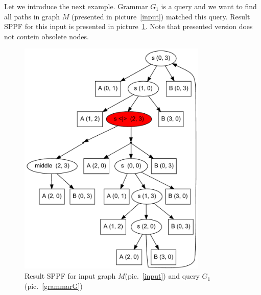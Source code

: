 \documentclass{sig-alternate} %
\begin{document}
Let we introduce the next example. Grammar $G_1$ is a query and we want to find all paths in graph $M$ (presented in picture~\ref{input}) matched this query.
Result SPPF for this input is presented in picture~\ref{SPPF}. Note that presented version does not contein obsolete nodes.

\begin{figure}[h]
    \begin{center}
        \includegraphics[width=9cm]{dot/AnBn.pdf}
        \caption{Result SPPF for input graph $M$(pic.~\ref{input}) and query $G_1$(pic.~\ref{grammarG})}
        \label{SPPF}        
    \end{center}
\end{figure}
\end{document}

